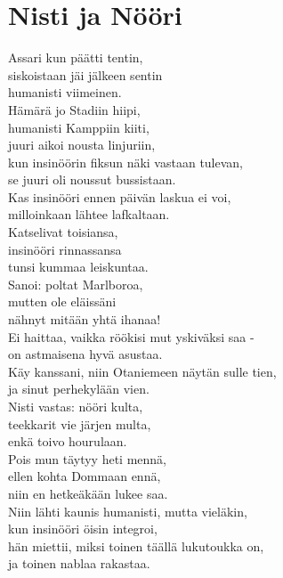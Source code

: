 \section{Nisti ja Nööri}

Assari kun päätti tentin, \\
siskoistaan jäi jälkeen sentin \\
humanisti viimeinen. \\
Hämärä jo Stadiin hiipi, \\
humanisti Kamppiin kiiti, \\
juuri aikoi nousta linjuriin, \\
kun insinöörin fiksun näki
vastaan tulevan, \\
se juuri oli noussut bussistaan. \\
Kas insinööri ennen päivän
laskua ei voi, \\
milloinkaan lähtee lafkaltaan. \\

Katselivat toisiansa, \\
insinööri rinnassansa \\
tunsi kummaa leiskuntaa. \\
Sanoi: poltat Marlboroa, \\
mutten ole eläissäni \\
nähnyt mitään yhtä ihanaa! \\
Ei haittaa, vaikka röökisi
mut yskiväksi saa -  \\
on astmaisena hyvä asustaa. \\
Käy kanssani, niin Otaniemeen
näytän sulle tien, \\
ja sinut perhekylään vien. \\

Nisti vastas: nööri kulta, \\
teekkarit vie järjen multa, \\
enkä toivo hourulaan. \\
Pois mun täytyy heti mennä, \\
ellen kohta Dommaan ennä, \\
niin en hetkeäkään lukee saa. \\
Niin lähti kaunis humanisti,
mutta vieläkin, \\
kun insinööri öisin integroi, \\
hän miettii, miksi toinen täällä
lukutoukka on, \\
ja toinen nablaa rakastaa.